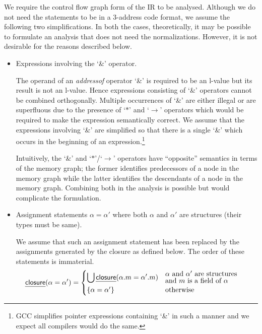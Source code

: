\documentclass[a4paper,11pt,fleqn]{article}
\begin{document}
We require the control flow graph form of the IR to be analysed.
Although we do not need the statements to be in a 3-address code format,
we assume the following two simplifications. In both the cases,
theoretically, it may be possible to formulate an analysis that does not
need the normalizations. However, it is not desirable for the reasons
described below.
\begin{itemize}
\item Expressions involving the `\&' operator.

      The operand of an {\em addressof\/} operator `\&' is required to
      be an l-value but its result is not an l-value. Hence expressions
      consisting of `\&' operators cannot be combined orthogonally.
      Multiple occurrences of `\&' are either illegal or are superfluous
      due to the presence of `$*$' and `$\rightarrow$' operators which
      would be required to make the expression semantically correct.
      We assume that the expressions involving `\&' are simplified so
      that there is a single `\&' which occurs in the beginning of an
      expression.\footnote{GCC simplifies pointer expressions containing
      `\&' in such a manner and we expect all compilers would do the same.}

      Intuitively, the `\&' and `$*$'/`$\rightarrow$' operators have
      ``opposite'' semantics in terms of the memory graph; the former
      identifies predecessors of a node in the memory graph while the
      latter identifies the descendants of a node in the memory graph.
      Combining both in the analysis is possible but would complicate
      the formulation.

\item Assignment statements $\alpha = \alpha'$ where both $\alpha$ and 
      $\alpha'$ are structures (their types must be same).

      We assume that such an assignment statement has been replaced by 
      the assignments generated by the closure as defined below. 
      The order of these statements is immaterial.
	\begin{align}
	\closure(\alpha = \alpha') &=
		\begin{cases}
			\displaystyle\bigcup \closure(\alpha.m = \alpha'.m)
			& \renewcommand{\arraystretch}{.8}\begin{array}{@{}l}
				\alpha \text{ and $\alpha'$ are structures}
				\\
				\text{and $m$ is a field of } \alpha
				\end{array}
			\\
		\left\{\alpha = \alpha'\right\} & \text{otherwise} 
		\end{cases}
	\end{align}


\end{itemize}
\end{document}
